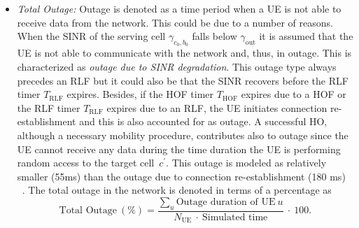 \documentclass[10pt, conference]{IEEEtran}
\begin{document}
   \begin{itemize}
     \item
    \textit{Total Outage:} Outage is denoted as a time period when a UE is not able to receive data from the network. This could be due to a number of reasons. When the SINR of the serving cell $\gamma_{c_0, b_0}$ falls below $\gamma_\mathrm{out}$ it is assumed that the UE is not able to communicate with the network and, thus, in outage. This is characterized as \textit{outage due to SINR degradation}. This outage type always precedes an RLF but it could also be that the SINR recovers before the RLF timer $T_\mathrm{RLF}$ expires. Besides, if the HOF timer $T_{\mathrm{HOF}}$ expires due to a HOF or the RLF timer $T_{\mathrm{RLF}}$ expires due to an RLF, the UE initiates connection re-establishment and this is also accounted for as outage. A successful HO, although a necessary mobility procedure, contributes also to outage since the UE cannot receive any data during the time duration the UE is performing random access to the target cell~$c^{\prime}$. This outage is modeled as relatively smaller (55ms) than the outage due to connection re-establishment (180 ms) ~\cite{b155}. The total outage in the network is denoted in terms of a percentage as 
%    
\begin{equation}
\label{Eq10} 
\textrm{Total Outage} \ (\%) = \frac{\sum_{u}{\textrm{Outage duration of UE}} \ u} {N_\mathrm{UE} \ \cdot \ \textrm{Simulated  time}} \ \cdot \ 100. 
\end{equation}
%
\end{itemize}

%
\end{document}
